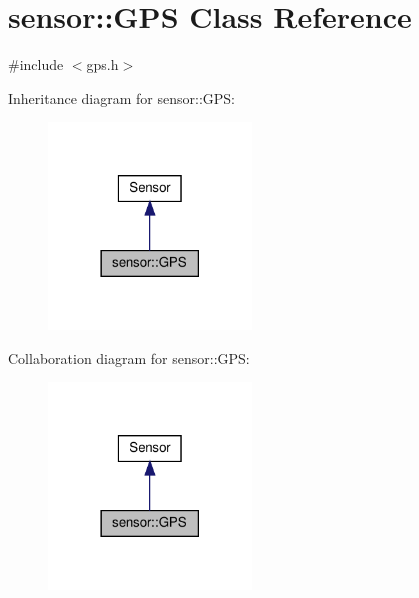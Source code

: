 \hypertarget{classsensor_1_1_g_p_s}{}\section{sensor\+:\+:G\+PS Class Reference}
\label{classsensor_1_1_g_p_s}


{\ttfamily \#include $<$gps.\+h$>$}



Inheritance diagram for sensor\+:\+:G\+PS\+:\nopagebreak
\begin{figure}[H]
\begin{center}
\leavevmode
\includegraphics[width=153pt]{classsensor_1_1_g_p_s__inherit__graph}
\end{center}
\end{figure}


Collaboration diagram for sensor\+:\+:G\+PS\+:\nopagebreak
\begin{figure}[H]
\begin{center}
\leavevmode
\includegraphics[width=153pt]{classsensor_1_1_g_p_s__coll__graph}
\end{center}
\end{figure}
